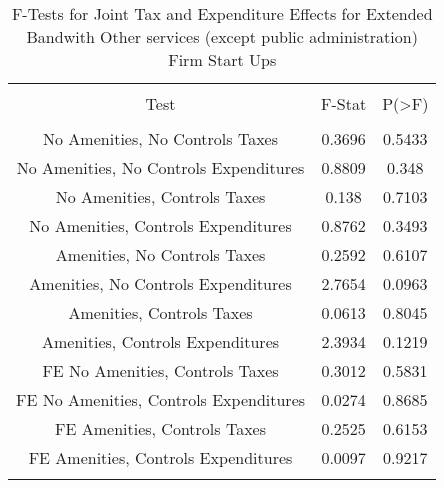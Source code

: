 
\begin{table}[!htbp] \centering 
  \caption{F-Tests for Joint Tax and Expenditure Effects for Extended Bandwith Other services (except public administration) Firm Start Ups} 
  \label{81Ftests} 
\begin{tabular}{@{\extracolsep{5pt}} ccc} 
\\[-1.8ex]\hline 
\hline \\[-1.8ex] 
Test & F-Stat & P(\textgreater F) \\ 
\hline \\[-1.8ex] 
No Amenities, No Controls Taxes & 0.3696 & 0.5433 \\ 
No Amenities, No Controls Expenditures & 0.8809 & 0.348 \\ 
No Amenities, Controls Taxes & 0.138 & 0.7103 \\ 
No Amenities, Controls Expenditures & 0.8762 & 0.3493 \\ 
Amenities, No Controls Taxes & 0.2592 & 0.6107 \\ 
Amenities, No Controls Expenditures & 2.7654 & 0.0963 \\ 
Amenities, Controls Taxes & 0.0613 & 0.8045 \\ 
Amenities, Controls Expenditures & 2.3934 & 0.1219 \\ 
FE No Amenities, Controls Taxes & 0.3012 & 0.5831 \\ 
FE No Amenities, Controls Expenditures & 0.0274 & 0.8685 \\ 
FE Amenities, Controls Taxes & 0.2525 & 0.6153 \\ 
FE Amenities, Controls Expenditures & 0.0097 & 0.9217 \\ 
\hline \\[-1.8ex] 
\end{tabular} 
\end{table} 

